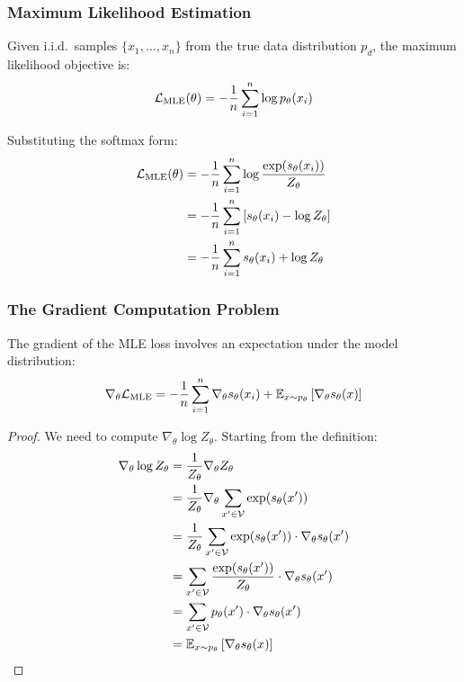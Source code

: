 \begin{notechapter}
\subsubsection{Maximum Likelihood Estimation}

Given i.i.d.\ samples $\{x_1, \ldots, x_n\}$ from the true data distribution $p_d$, the maximum likelihood objective is:
\begin{equation}
\mathcal{L}_{\text{MLE}}(\theta) = -\frac{1}{n}\sum_{i=1}^{n} \log p_\theta(x_i)
\end{equation}

Substituting the softmax form:
\begin{align}
\mathcal{L}_{\text{MLE}}(\theta) &= -\frac{1}{n}\sum_{i=1}^{n} \log \frac{\exp(s_\theta(x_i))}{Z_\theta} \\
&= -\frac{1}{n}\sum_{i=1}^{n} \left[s_\theta(x_i) - \log Z_\theta\right] \\
&= -\frac{1}{n}\sum_{i=1}^{n} s_\theta(x_i) + \log Z_\theta
\end{align}

\subsubsection{The Gradient Computation Problem}

\begin{theorem}
\label{contrastive-rigorous:thm:mle_gradient}
The gradient of the MLE loss involves an expectation under the model distribution:
\begin{equation}
\nabla_\theta \mathcal{L}_{\text{MLE}} = -\frac{1}{n}\sum_{i=1}^{n} \nabla_\theta s_\theta(x_i) + \mathbb{E}_{x \sim p_\theta}\left[\nabla_\theta s_\theta(x)\right]
\end{equation}
\end{theorem}

\begin{proof}
We need to compute $\nabla_\theta \log Z_\theta$. Starting from the definition:
\begin{align}
\nabla_\theta \log Z_\theta &= \frac{1}{Z_\theta} \nabla_\theta Z_\theta \\
&= \frac{1}{Z_\theta} \nabla_\theta \sum_{x' \in \mathcal{V}} \exp(s_\theta(x')) \\
&= \frac{1}{Z_\theta} \sum_{x' \in \mathcal{V}} \exp(s_\theta(x')) \cdot \nabla_\theta s_\theta(x') \\
&= \sum_{x' \in \mathcal{V}} \frac{\exp(s_\theta(x'))}{Z_\theta} \cdot \nabla_\theta s_\theta(x') \\
&= \sum_{x' \in \mathcal{V}} p_\theta(x') \cdot \nabla_\theta s_\theta(x') \\
&= \mathbb{E}_{x \sim p_\theta}\left[\nabla_\theta s_\theta(x)\right]
\end{align}


\end{proof}
\end{notechapter}
